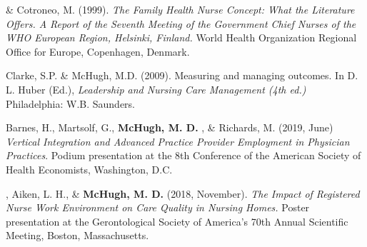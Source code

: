 \documentclass[10pt,]{article}
\begin{document}
{{{{{{{{{{{{{{{\begin{hangparas}{.25in}{1}

 \& Cotroneo, M. (1999). {\textit {The Family Health Nurse Concept: What the Literature Offers. A Report of the Seventh Meeting of the Government Chief Nurses of the WHO European Region, Helsinki, Finland.}} World Health Organization Regional Office for Europe, Copenhagen, Denmark.

\end{hangparas}

\vspace{4mm}


\begin{hangparas}{.25in}{1}

\*Clarke, S.P. \& McHugh, M.D. (2009). Measuring and managing outcomes. In D. L. Huber (Ed.), {\textit {Leadership and Nursing Care Management (4th ed.)}} Philadelphia: W.B. Saunders.

\end{hangparas}

\vspace{4mm}


\begin{hangparas}{.25in}{1}

\*Barnes, H., Martsolf, G., {\textbf {McHugh, M. D.}} , \& Richards, M. (2019, June) {\textit {Vertical Integration and Advanced Practice Provider Employment in Physician Practices}}. Podium presentation at the 8th Conference of the American Society of Health Economists, Washington, D.C.

\end{hangparas}

\begin{hangparas}{.25in}{1}

, Aiken, L. H., \& {\textbf {McHugh, M. D.}} (2018, November). {\textit {The Impact of Registered Nurse Work Environment on Care Quality in Nursing Homes.}} Poster presentation at the Gerontological Society of America's 70th Annual Scientific Meeting, Boston, Massachusetts.

\end{hangparas}

\begin{hangparas}{.25in}{1}


\end{hangparas}}}}}}}}}}}}}}}}
\end{document}
